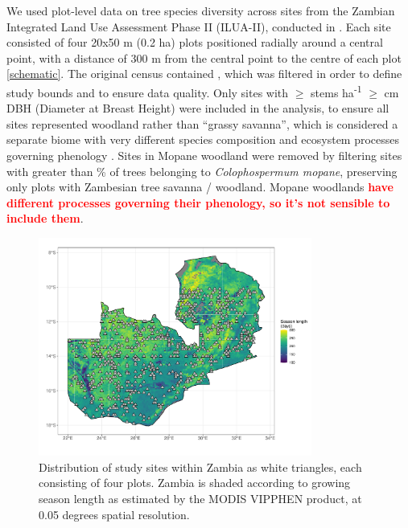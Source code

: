 \documentclass[11pt,a4paper]{article}
\newcommand{\todo}[1]{\textcolor{red}{\textbf{#1}}}   %
\begin{document}
We used plot-level data on tree species diversity across \nSites{} sites from the Zambian Integrated Land Use Assessment Phase II (ILUA-II), conducted in \censusDate{} \citep{}. Each site consisted of four 20x50 m (0.2 ha) plots positioned radially around a central point, with a distance of 300 m from the central point to the centre of each plot \autoref{schematic}. The original census contained \nTotalSites{}, which was filtered in order to define study bounds and to ensure data quality. Only sites with $\geq$\stemsHa{} stems ha\textsuperscript{-1} $\geq$\stemSize{} cm DBH (Diameter at Breast Height) were included in the analysis, to ensure all sites represented woodland rather than “grassy savanna”, which is considered a separate biome with very different species composition and ecosystem processes governing phenology \citep{Parr2014}. Sites in Mopane woodland were removed by filtering sites with greater than \mopanePer{}\% of trees belonging to \textit{Colophospermum mopane}, preserving only plots with Zambesian tree savanna / woodland. Mopane woodlands \todo{have different processes governing their phenology, so it's not sensible to include them}. 
\begin{figure}[H]
\centering
	\includegraphics[width=0.8\textwidth]{plot_loc}
	\caption{Distribution of study sites within Zambia as white triangles, each consisting of four plots. Zambia is shaded according to growing season length as estimated by the MODIS VIPPHEN product, at 0.05 degrees spatial resolution.}
	\label{plot_loc}
\end{figure}
\end{document}
